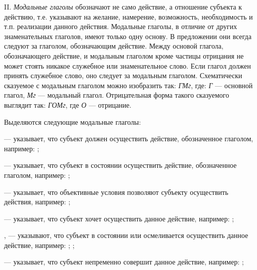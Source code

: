 II. \emph{Модальные глаголы} обозначают не само действие, а отношение субъекта к действию, т.е. указывают на желание, намерение, возможность, необходимость и т.п. реализации данного действия. Модальные глаголы, в отличие от других знаменательных глаголов, имеют только одну основу. В предложении они всегда следуют за глаголом, обозначающим действие. Между основой глагола, обозначающего действие, и модальным глаголом кроме частицы отрицания не может стоять никакое служебное или знаменательное слово. Если глагол должен принять служебное слово, оно следует за модальным глаголом. Схематически сказуемое с модальным глаголом можно изобразить так: \emph{ГМг}, где: \emph{Г} --- основной глагол, \emph{Мг} --- модальный глагол. Отрицательная форма такого сказуемого выглядит так: \emph{ГОМг}, где \emph{О} --- отрицание.

Выделяются следующие модальные глаголы:

 --- указывает, что субъект должен осуществить действие, обозначенное глаголом, например:
;

 --- указывает, что субъект в состоянии осуществить действие, обозначенное глаголом, например: ;

 --- указывает, что объективные условия позволяют субъекту осуществить действия, например: ;

 --- указывает, что субъект хочет осуществить данное действие, например: ;

,  --- указывают, что субъект в состоянии или осмеливается осуществить данное действие, например:
;
;

 --- указывает, что субъект непременно совершит данное действие, например: ;

